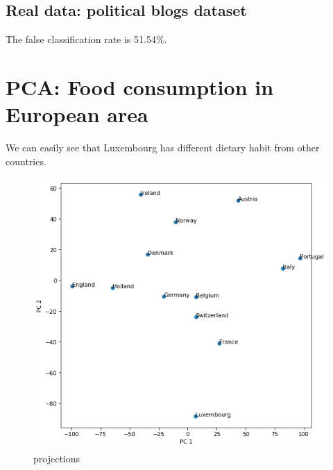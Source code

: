 \documentclass{article}
\begin{document}
\subsection{Real data: political blogs dataset}
The false classification rate is 51.54\%.

\section{PCA: Food consumption in European area}

We can easily see that Luxembourg has different dietary habit from other countries.

\begin{figure}[h!]
\centering
  \caption{projections}
  \includegraphics[scale=0.6]{Q3.png}
\end{figure}
\end{document}
